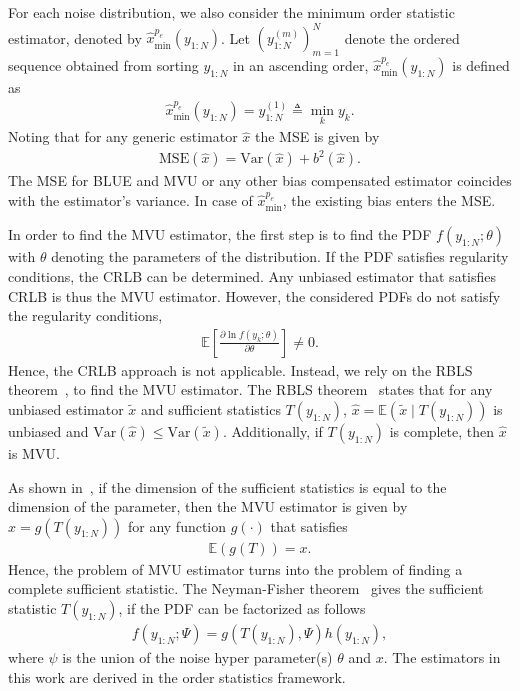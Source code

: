 \documentclass{article}
\newcommand{\E}{\mathbb{E}}
\newcommand{\Var}{\mathrm{Var}}
\newcommand{\MSE}{\mathrm{MSE}}
\begin{document}
For each noise distribution, we also consider the minimum order statistic estimator, denoted by $\hat{x}^{p_e}_{\mathrm{min}}(y_{1:N})$. Let $\left(y^{(m)}_{1:N}\right)_{m=1}^{N}$ denote the ordered sequence obtained from sorting $y_{1:N}$ in an ascending order, $\hat{x}^{p_e}_{\mathrm{min}}(y_{1:N})$ is defined as
%
%
\begin{align}
	\hat{x}^{p_e}_{\mathrm{min}}(y_{1:N}) = y_{1:N}^{(1)} \triangleq \min_{k} y_k.
\end{align}
%
%
Noting that for any generic estimator $\hat{x}$ the MSE is given by
%
%
\begin{align}\label{eq:mse_generic}
\MSE(\hat{x}) = \Var(\hat{x}) + b^2(\hat{x}).
\end{align}
%
%
The MSE for BLUE and MVU or any other bias compensated estimator coincides with the estimator's variance. In case of $\hat{x}^{p_e}_{\mathrm{min}}$, the existing bias enters the MSE.

In order to find the MVU estimator, the first step is to find the PDF $f(y_{1:N};\theta)$ with $\theta$ denoting the parameters of the distribution. If the PDF satisfies regularity conditions, the CRLB can be determined. Any unbiased estimator that satisfies CRLB is thus the MVU estimator. However, the considered PDFs do not satisfy the regularity conditions,
%
%
\begin{align}
\E\left[\frac{\partial\ln f(y_k;\theta)}{\partial \theta}\right]\neq0.
\end{align}
%
%
Hence, the CRLB approach is not applicable. Instead, we rely on the RBLS theorem~\citep{article:IJS_lehmann_1,article:IJS_lehmann_2,book:ET_kay_93}, to find the MVU estimator. The RBLS theorem~\citep{article:IJS_lehmann_1} states that for any unbiased estimator $\tilde{x}$ and sufficient statistics $T(y_{1:N})$, $\hat{x}=\E(\tilde{x}\mid T(y_{1:N}))$ is unbiased and $\Var(\hat{x})\leq\Var(\tilde{x})$. Additionally, if $T(y_{1:N})$ is complete, then $\hat{x}$ is MVU.

As shown in~\citep{book:ET_kay_93}, if the dimension of the sufficient statistics is equal to the dimension of the parameter, then the MVU estimator is given by $\hat{x}=g(T(y_{1:N}))$ for any function $g(\cdot)$ that satisfies
%
%
\begin{align}
\E(g(T)) = x.
\end{align}
%
%
Hence, the problem of MVU estimator turns into the problem of finding a complete sufficient statistic. The Neyman-Fisher theorem~\citep{article:fisher_22,article:AMS_halmos_49} gives the sufficient statistic $T(y_{1:N})$, if the PDF can be factorized as follows
%
%
\begin{align}
f(y_{1:N};\Psi) =g(T(y_{1:N}),\Psi)h(y_{1:N}),
\end{align}
%
%
where $\psi$ is the union of the noise hyper parameter(s) $\theta$ and $x$. The estimators in this work are derived in the order statistics framework. 
%
%
\end{document}

